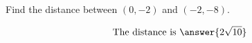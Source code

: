 \documentclass{ximera}
\author{Bart Snapp}
\begin{document}
\begin{exercise}
  Find the distance between $(0,-2)$ and $(-2,-8)$.
  \begin{prompt}
  \[
  \text{The distance is }\answer{2\sqrt{10}}
  \]
  \end{prompt}
\end{exercise}
\end{document}
